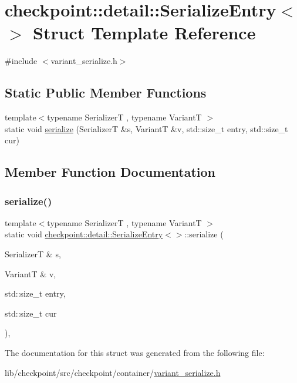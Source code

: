 \hypertarget{structcheckpoint_1_1detail_1_1_serialize_entry_3_4}{}\section{checkpoint\+:\+:detail\+:\+:Serialize\+Entry$<$$>$ Struct Template Reference}
\label{structcheckpoint_1_1detail_1_1_serialize_entry_3_4}


{\ttfamily \#include $<$variant\+\_\+serialize.\+h$>$}

\subsection*{Static Public Member Functions}
\begin{DoxyCompactItemize}
\item 
{\footnotesize template$<$typename SerializerT , typename VariantT $>$ }\\static void \hyperlink{structcheckpoint_1_1detail_1_1_serialize_entry_3_4_a77af1b1d54867fc5aa9c1f40d4cfeed3}{serialize} (SerializerT \&s, VariantT \&v, std\+::size\+\_\+t entry, std\+::size\+\_\+t cur)
\end{DoxyCompactItemize}


\subsection{Member Function Documentation}
\mbox{\label{structcheckpoint_1_1detail_1_1_serialize_entry_3_4_a77af1b1d54867fc5aa9c1f40d4cfeed3}} 
\subsubsection{\texorpdfstring{serialize()}{serialize()}}
{\footnotesize\ttfamily template$<$typename SerializerT , typename VariantT $>$ \\
static void \hyperlink{structcheckpoint_1_1detail_1_1_serialize_entry}{checkpoint\+::detail\+::\+Serialize\+Entry}$<$$>$\+::serialize (\begin{DoxyParamCaption}\item[{SerializerT \&}]{s,  }\item[{VariantT \&}]{v,  }\item[{std\+::size\+\_\+t}]{entry,  }\item[{std\+::size\+\_\+t}]{cur }\end{DoxyParamCaption})\hspace{0.3cm}{\ttfamily [inline]}, {\ttfamily [static]}}



The documentation for this struct was generated from the following file\+:\begin{DoxyCompactItemize}
\item 
lib/checkpoint/src/checkpoint/container/\hyperlink{variant__serialize_8h}{variant\+\_\+serialize.\+h}\end{DoxyCompactItemize}
